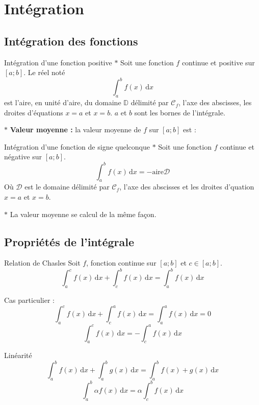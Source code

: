 \section{Intégration}
\subsection{Intégration des fonctions}
\begin{bclogo}{Intégration d'une fonction positive}
$\ast$ Soit une fonction $f$ continue et positive sur $[a;b]$. Le réel noté \[\int_{a}^{b} f(x)\,\mathrm{d}x\] est l'aire, en unité d'aire, du domaine $\mathbb{D}$ délimité par $\mathcal{C}_f$, l'axe des abscisses, les droites d'équations $x=a$ et $x=b$. $a$ et $b$ sont les bornes de l'intégrale.

$\ast$ \textbf{Valeur moyenne : }la valeur moyenne de $f$ sur $[a;b]$ est : 

\end{bclogo}

\medskip

\begin{bclogo}{Intégration d'une fonction de signe quelconque}
$\ast$ Soit une fonction $f$ continue et négative sur $[a;b]$. \[\int_{a}^{b} f(x)\,\mathrm{d}x=-\text{aire} \mathcal{D}\]
Où $\mathcal{D}$ est le domaine délimité par $\mathcal{C}_f$, l'axe des abscisses et les droites d'quation $x=a$ et $x=b$.


$\ast$ La valeur moyenne se calcul de la même façon.
\end{bclogo}

\subsection{Propriétés de l'intégrale}

\begin{bclogo}{Relation de Chasles}
Soit $f$, fonction continue sur $[a;b]$ et $c\in [a;b]$. \[\int_{a}^{c}f(x)\,\mathrm{d}x+\int_{c}^{b}f(x)\,\mathrm{d}x=\int_{a}^{b}f(x)\,\mathrm{d}x\]

Cas particulier : \[\int_{a}^{c}f(x)\,\mathrm{d}x+\int_{c}^{a}f(x)\,\mathrm{d}x=\int_{a}^{a}f(x)\,\mathrm{d}x=0\]
\[\int_{a}^{c}f(x)\,\mathrm{d}x=-\int_{c}^{a}f(x)\,\mathrm{d}x\]
\end{bclogo}


\begin{bclogo}{Linéarité}
\[\int_{a}^{b}f(x)\,\mathrm{d}x+\int_{a}^{b}g(x)\,\mathrm{d}x=\int_{a}^{b}f(x)+g(x)\,\mathrm{d}x\]
\[\int_{a}^{b}\alpha f(x)\,\mathrm{d}x=\alpha \int_{c}^{b}f(x)\,\mathrm{d}x\]
\end{bclogo}

